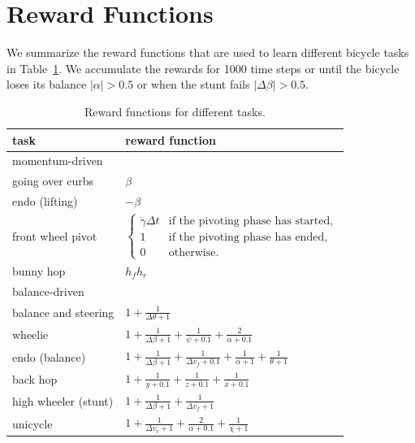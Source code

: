 \section{Reward Functions}
We summarize the reward functions that are used to learn different bicycle tasks in Table~\ref{table:rewardFunction}. We accumulate the rewards for 1000 time steps or until the bicycle loses its balance $|\alpha|>0.5$ or when the stunt fails $|\Delta \beta|>0.5$.
\begin{table}[ht]
\vspace{-0.1in}
\centering
 \caption{Reward functions for different tasks. }
\begin{tabular}{|l|l|}
\hline
task & reward function\\
\hline
momentum-driven & \\
\hline
going over curbs      & $\beta$ \\
endo (lifting)        & $-\beta$ \\
front wheel pivot     & $ \left\{ \begin{array}{ll} \dot{\gamma} \Delta t & \textrm{if the pivoting phase has started,}\\ 1 & \textrm{if the pivoting phase has ended,} \\ 0 & \textrm{otherwise.} \end{array} \right. $\\
bunny hop             & $h_fh_r$\\
\hline
balance-driven & \\
\hline
balance and steering  & $1 + \frac{1}{\Delta \theta+1}$ \\
wheelie               & $1 + \frac{1}{\Delta \beta + 1} + \frac{1}{\psi + 0.1} + \frac{2}{\alpha + 0.1}$ \\
endo (balance)        & $1 + \frac{1}{\Delta \beta + 1} + \frac{1}{\Delta v_f + 0.1} + \frac{1}{\alpha + 1} + \frac{1}{\theta + 1}$ \\
back hop              & $1 + \frac{1}{y + 0.1} + \frac{1}{z + 0.1} + \frac{1}{x + 0.1}$\\
high wheeler (stunt)  & $1 + \frac{1}{\Delta \beta + 1} + \frac{1}{\Delta v_f + 1} $\\
unicycle              & $1 + \frac{1}{\Delta v_r + 1} + \frac{2}{\alpha + 0.1} + \frac{1}{\chi + 1}$\\
\hline
 \end{tabular}
 \vspace{-0.1in}
 \label{table:rewardFunction}
 \end{table}

